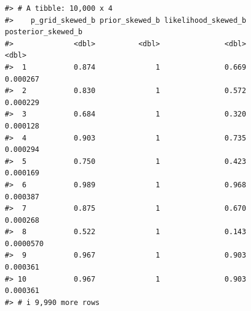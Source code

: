 \documentclass[
  letterpaper,
  DIV=11,
  numbers=noendperiod]{scrreprt}
\begin{document}
\begin{verbatim}
#> # A tibble: 10,000 x 4
#>    p_grid_skewed_b prior_skewed_b likelihood_skewed_b posterior_skewed_b
#>              <dbl>          <dbl>               <dbl>              <dbl>
#>  1           0.874              1               0.669          0.000267 
#>  2           0.830              1               0.572          0.000229 
#>  3           0.684              1               0.320          0.000128 
#>  4           0.903              1               0.735          0.000294 
#>  5           0.750              1               0.423          0.000169 
#>  6           0.989              1               0.968          0.000387 
#>  7           0.875              1               0.670          0.000268 
#>  8           0.522              1               0.143          0.0000570
#>  9           0.967              1               0.903          0.000361 
#> 10           0.967              1               0.903          0.000361 
#> # i 9,990 more rows
\end{verbatim}
\end{document}
